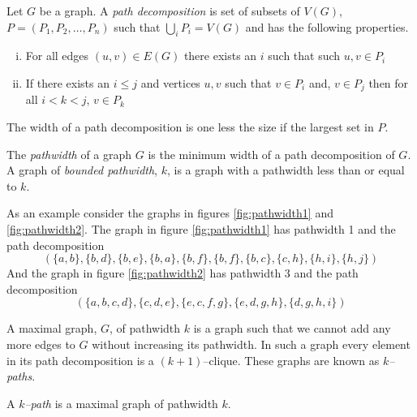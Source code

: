 \begin{definition}
    Let $G$ be a graph. A \textit{path decomposition} is set of subsets of $V(G)$, $P=(P_1,P_2,\dots,P_n)$ such that $\bigcup_{i} P_i=V(G)$ and has the following properties.    
    \begin{enumerate}[(i)]
        \item For all edges $(u,v) \in E(G)$ there exists an $i$ such that such $u,v\in P_i$
        \item If there exists an $i\leq j$ and vertices $u,v$ such that $v\in P_i$ and, $v\in P_j$ then for all $i<k<j$, $v\in P_k$
    \end{enumerate}
    The width of a path decomposition is one less the size if the largest set in $P$.
\end{definition}

\begin{definition}[Pathwidth]
    The \textit{pathwidth} of a graph $G$ is the minimum width of a path decomposition of $G$.    
    A graph of \textit{bounded pathwidth}, $k$, is a graph with a pathwidth less than or equal to $k$. 
\end{definition}

As an example consider the graphs in figures \ref{fig:pathwidth1} and \ref{fig:pathwidth2}. The graph in figure \ref{fig:pathwidth1} has pathwidth 1 and the path decomposition
\[(\{a,b\},\{b,d\},\{b,e\},\{b,a\},\{b,f\},\{b,f\},\{b,c\},\{c,h\},\{h,i\},\{h,j\})\]
And the graph in figure \ref{fig:pathwidth2} has pathwidth 3 and the path decomposition 
\[(\{a,b,c,d\},\{c,d,e\},\{e,c,f,g\},\{e,d,g,h\},\{d,g,h,i\})\] 

A maximal graph, $G$, of pathwidth $k$ is a graph such that we cannot add any more edges to $G$ without increasing its pathwidth. In such a graph every element in its path decomposition is a $(k+1)$--clique. These graphs are known as \textit{$k$--paths}.
\begin{definition}[$k$--path]
    A \textit{$k$--path} is a maximal graph of pathwidth $k$.
\end{definition}

